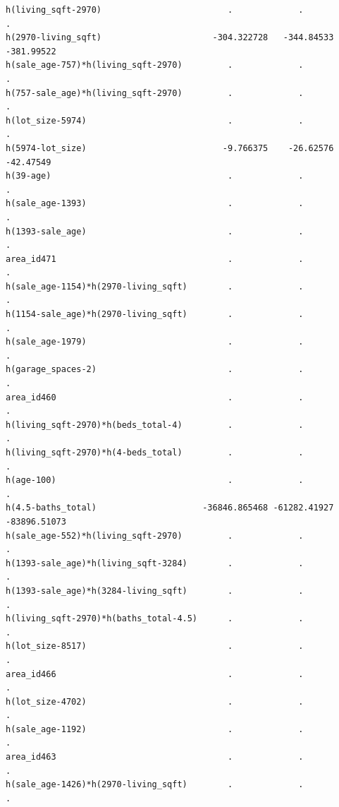 \documentclass[
]{article}
\begin{document}
\begin{verbatim}
h(living_sqft-2970)                         .             .            .      
h(2970-living_sqft)                      -304.322728   -344.84533   -381.99522
h(sale_age-757)*h(living_sqft-2970)         .             .            .      
h(757-sale_age)*h(living_sqft-2970)         .             .            .      
h(lot_size-5974)                            .             .            .      
h(5974-lot_size)                           -9.766375    -26.62576    -42.47549
h(39-age)                                   .             .            .      
h(sale_age-1393)                            .             .            .      
h(1393-sale_age)                            .             .            .      
area_id471                                  .             .            .      
h(sale_age-1154)*h(2970-living_sqft)        .             .            .      
h(1154-sale_age)*h(2970-living_sqft)        .             .            .      
h(sale_age-1979)                            .             .            .      
h(garage_spaces-2)                          .             .            .      
area_id460                                  .             .            .      
h(living_sqft-2970)*h(beds_total-4)         .             .            .      
h(living_sqft-2970)*h(4-beds_total)         .             .            .      
h(age-100)                                  .             .            .      
h(4.5-baths_total)                     -36846.865468 -61282.41927 -83896.51073
h(sale_age-552)*h(living_sqft-2970)         .             .            .      
h(1393-sale_age)*h(living_sqft-3284)        .             .            .      
h(1393-sale_age)*h(3284-living_sqft)        .             .            .      
h(living_sqft-2970)*h(baths_total-4.5)      .             .            .      
h(lot_size-8517)                            .             .            .      
area_id466                                  .             .            .      
h(lot_size-4702)                            .             .            .      
h(sale_age-1192)                            .             .            .      
area_id463                                  .             .            .      
h(sale_age-1426)*h(2970-living_sqft)        .             .            .      
                                                                  

\end{verbatim}
\end{document}
